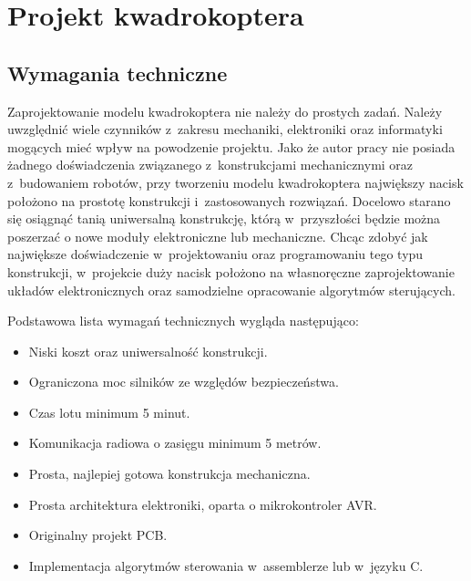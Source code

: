 
\chapter{Projekt kwadrokoptera} %

\label{Chapter5} %



\section{Wymagania techniczne}

Zaprojektowanie modelu kwadrokoptera nie należy do prostych zadań. Należy uwzględnić wiele czynników z~zakresu mechaniki, elektroniki oraz informatyki mogących mieć wpływ na powodzenie projektu. Jako że autor pracy nie posiada żadnego doświadczenia związanego z~konstrukcjami mechanicznymi oraz z~budowaniem robotów, przy tworzeniu modelu kwadrokoptera największy nacisk położono na prostotę konstrukcji i~zastosowanych rozwiązań. Docelowo starano się osiągnąć tanią uniwersalną konstrukcję, którą w~przyszłości będzie można poszerzać o nowe moduły elektroniczne lub mechaniczne. Chcąc zdobyć jak największe doświadczenie w~projektowaniu oraz programowaniu tego typu konstrukcji, w~projekcie duży nacisk położono na własnoręczne zaprojektowanie układów elektronicznych oraz samodzielne opracowanie algorytmów sterujących.

Podstawowa lista wymagań technicznych wygląda następująco:

\begin{itemize}
	\item Niski koszt oraz uniwersalność konstrukcji.
	\item Ograniczona moc silników ze względów bezpieczeństwa.
	\item Czas lotu minimum 5 minut.
	\item Komunikacja radiowa o zasięgu minimum 5 metrów.
	\item Prosta, najlepiej gotowa konstrukcja mechaniczna.
	\item Prosta architektura elektroniki, oparta o mikrokontroler AVR.
	\item Originalny projekt PCB.
	\item Implementacja algorytmów sterowania w~assemblerze lub w~języku C.
\end{itemize}

